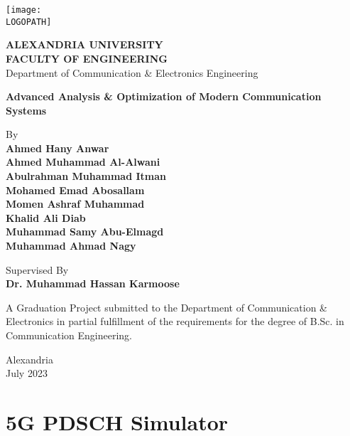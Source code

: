 \documentclass[12pt, a4paper, oneside]{book}
\def \LOGOPATH {au-logo1}
\def \UNIVERSITY {ALEXANDRIA UNIVERSITY}
\def \FACULTY {FACULTY OF ENGINEERING}
\def \DEPARTMENT {Department of Communication \& Electronics Engineering}
\def \PROJECTTITLE {Advanced Analysis \& Optimization of Modern Communication Systems}
\def \SUPERVISOR {Dr. Muhammad Hassan Karmoose}
\begin{document}
\setlength{\parindent}{0em}
\setlength{\parskip}{1.5em}


\begin{titlepage}
    \centering
    \vfill
    \begin{center}
        \texttt{[image: \\LOGOPATH]}

        \vfill

        \textbf{\UNIVERSITY} \\
        \textbf{\FACULTY} \\
        \DEPARTMENT

        \vfill

        \LARGE{\textbf{\PROJECTTITLE}}
    
        \vfill
        By \\
        \textbf{Ahmed Hany Anwar} \\
        \textbf{Ahmed Muhammad Al-Alwani} \\
        \textbf{Abulrahman Muhammad Itman} \\
        \textbf{Mohamed Emad Abosallam} \\
        \textbf{Momen Ashraf Muhammad} \\
        \textbf{Khalid Ali Diab} \\
        \textbf{Muhammad Samy Abu-Elmagd} \\
        \textbf{Muhammad Ahmad Nagy}

        \vfill
        Supervised By \\
        \textbf{\SUPERVISOR}

        \vfill
        \large{A Graduation Project submitted to the Department of Communication \& Electronics in partial fulfillment of the requirements for the degree of B.Sc. in Communication Engineering.}

        \vspace{0.5cm}
        Alexandria\\
        July 2023
    
    \end{center}
\end{titlepage}

\setlength{\parskip}{0.65em}

\tableofcontents
\listoffigures

\setlength{\parskip}{0.8em}

\part{5G PDSCH Simulator}

\end{document}
